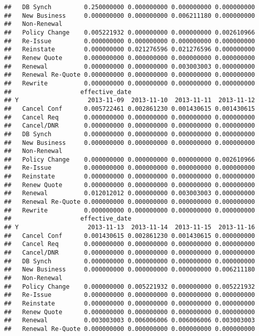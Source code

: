 \documentclass[]{article}
\begin{document}
\begin{verbatim}
##   DB Synch         0.250000000 0.000000000 0.000000000 0.000000000
##   New Business     0.000000000 0.000000000 0.006211180 0.000000000
##   Non-Renewal                                                     
##   Policy Change    0.005221932 0.000000000 0.000000000 0.002610966
##   Re-Issue         0.000000000 0.000000000 0.000000000 0.000000000
##   Reinstate        0.000000000 0.021276596 0.021276596 0.000000000
##   Renew Quote      0.000000000 0.000000000 0.000000000 0.000000000
##   Renewal          0.000000000 0.000000000 0.003003003 0.000000000
##   Renewal Re-Quote 0.000000000 0.000000000 0.000000000 0.000000000
##   Rewrite          0.000000000 0.000000000 0.000000000 0.000000000
##                   effective_date
## Y                   2013-11-09  2013-11-10  2013-11-11  2013-11-12
##   Cancel Conf      0.005722461 0.002861230 0.001430615 0.001430615
##   Cancel Req       0.000000000 0.000000000 0.000000000 0.000000000
##   Cancel/DNR       0.000000000 0.000000000 0.000000000 0.000000000
##   DB Synch         0.000000000 0.000000000 0.000000000 0.000000000
##   New Business     0.000000000 0.000000000 0.000000000 0.000000000
##   Non-Renewal                                                     
##   Policy Change    0.000000000 0.000000000 0.000000000 0.002610966
##   Re-Issue         0.000000000 0.000000000 0.000000000 0.000000000
##   Reinstate        0.000000000 0.000000000 0.000000000 0.000000000
##   Renew Quote      0.000000000 0.000000000 0.000000000 0.000000000
##   Renewal          0.012012012 0.000000000 0.003003003 0.000000000
##   Renewal Re-Quote 0.000000000 0.000000000 0.000000000 0.000000000
##   Rewrite          0.000000000 0.000000000 0.000000000 0.000000000
##                   effective_date
## Y                   2013-11-13  2013-11-14  2013-11-15  2013-11-16
##   Cancel Conf      0.001430615 0.002861230 0.001430615 0.000000000
##   Cancel Req       0.000000000 0.000000000 0.000000000 0.000000000
##   Cancel/DNR       0.000000000 0.000000000 0.000000000 0.000000000
##   DB Synch         0.000000000 0.000000000 0.000000000 0.000000000
##   New Business     0.000000000 0.000000000 0.000000000 0.006211180
##   Non-Renewal                                                     
##   Policy Change    0.000000000 0.005221932 0.000000000 0.005221932
##   Re-Issue         0.000000000 0.000000000 0.000000000 0.000000000
##   Reinstate        0.000000000 0.000000000 0.000000000 0.000000000
##   Renew Quote      0.000000000 0.000000000 0.000000000 0.000000000
##   Renewal          0.003003003 0.006006006 0.006006006 0.003003003
##   Renewal Re-Quote 0.000000000 0.000000000 0.000000000 0.000000000

\end{verbatim}
\end{document}
